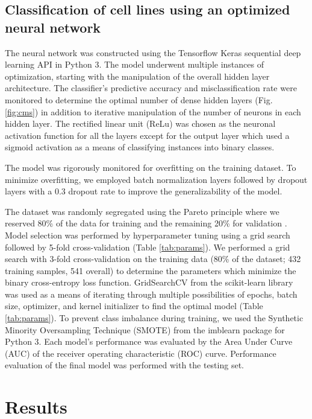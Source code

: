 \documentclass[10pt, letterpaper]{article}
\begin{document}
\begin{multicols*}{2}
\subsection{Classification of cell lines using an optimized neural network}
The neural network was constructed using the Tensorflow Keras sequential deep learning API in Python 3. The model underwent multiple instances of optimization, starting with the manipulation of the overall hidden layer architecture. The classifier's predictive accuracy and misclassification rate were monitored to determine the optimal number of dense hidden layers (Fig. \ref{fig:cms}) in addition to iterative manipulation of the number of neurons in each hidden layer. The rectified linear unit (ReLu) was chosen as the neuronal activation function for all the layers except for the output layer which used a sigmoid activation as a means of classifying instances into binary classes.

The model was rigorously monitored for overfitting on the training dataset. To minimize overfitting, we employed batch normalization layers followed by dropout layers with a 0.3 dropout rate to improve the generalizability of the model.

The dataset was randomly segregated using the Pareto principle where we reserved 80\% of the data for training and the remaining 20\% for validation \cite{pareto}. Model selection was performed by hyperparameter tuning using a grid search followed by 5-fold cross-validation (Table \ref{tab:params}). We performed a grid search with 3-fold cross-validation on the training data (80\% of the dataset; 432 training samples, 541 overall) to determine the parameters which minimize the binary cross-entropy loss function. GridSearchCV from the scikit-learn library was used as a means of iterating through multiple possibilities of epochs, batch size, optimizer, and kernel initializer to find the optimal model (Table \ref{tab:params}). To prevent class imbalance during training, we used the Synthetic Minority Oversampling Technique (SMOTE) from the imblearn package for Python 3. Each model’s performance was evaluated by the Area Under Curve (AUC) of the receiver operating characteristic (ROC) curve. Performance evaluation of the final model was performed with the testing set.


\section{Results}


\end{multicols*}
\end{document}
